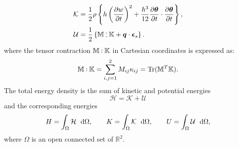 \documentclass[preprint,12pt]{elsarticle}
\DeclareMathOperator{\Tr}{Tr}
\def\onedot{$\mathsurround0pt\ldotp$}
\def\cddot{%
	\mathbin{\vcenter{\baselineskip.67ex
			\hbox{\onedot}\hbox{\onedot}}%
}}
\begin{document}
{\begin{align*}
\mathcal{K} &= \frac{1}{2} \rho \left\{ h \left(\diffp{w}{t}\right)^2 +  \frac{h^3}{12} \diffp{\bm\theta}{t} \cdot \diffp{\bm\theta}{t} \right\} ,\\
\mathcal{U} &= \frac{1}{2} \left\{ \mathbb{M} \cddot \mathbb{K} + \bm{q} \cdot \bm{\epsilon}_s \right\} .	
\end{align*} 
where the tensor contraction $ \mathbb{M} \cddot \mathbb{K}$ in Cartesian coordinates is expressed as:
\[\mathbb{M} \cddot \mathbb{K} = \sum_{i,j = 1}^{2} M_{ij} \kappa_{ij} = \Tr(\mathbb{M}^T \mathbb{K}). \]
The total energy density is the sum of kinetic and potential energies
\begin{equation}
\mathcal{H} = \mathcal{K} + \mathcal{U}
\end{equation}
and the corresponding energies
\begin{equation}
H = \int_{\Omega} \mathcal{H} \ \d\Omega, \qquad K = \int_{\Omega} \mathcal{K} \ \d\Omega, \qquad U = \int_{\Omega} \mathcal{U} \ \d\Omega,
\end{equation}
where $\Omega$ is an open connected set of $\mathbb{R}^2$.
}
\end{document}
